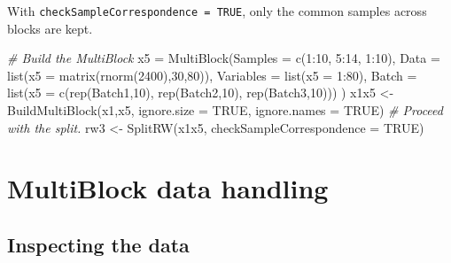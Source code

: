 \documentclass[
]{book}
\newenvironment{Shaded}{\begin{snugshade}}{\end{snugshade}}
\newcommand{\AttributeTok}[1]{\textcolor[rgb]{0.77,0.63,0.00}{#1}}
\newcommand{\CommentTok}[1]{\textcolor[rgb]{0.56,0.35,0.01}{\textit{#1}}}
\newcommand{\ConstantTok}[1]{\textcolor[rgb]{0.00,0.00,0.00}{#1}}
\newcommand{\DecValTok}[1]{\textcolor[rgb]{0.00,0.00,0.81}{#1}}
\newcommand{\FunctionTok}[1]{\textcolor[rgb]{0.00,0.00,0.00}{#1}}
\newcommand{\NormalTok}[1]{#1}
\newcommand{\OtherTok}[1]{\textcolor[rgb]{0.56,0.35,0.01}{#1}}
\newcommand{\SpecialCharTok}[1]{\textcolor[rgb]{0.00,0.00,0.00}{#1}}
\newcommand{\StringTok}[1]{\textcolor[rgb]{0.31,0.60,0.02}{#1}}
\begin{document}
With \texttt{checkSampleCorrespondence\ =\ TRUE}, only the common samples across blocks
are kept.

\begin{Shaded}
\begin{Highlighting}[]
\CommentTok{\# Build the MultiBlock}
\NormalTok{x5 }\OtherTok{=} \FunctionTok{MultiBlock}\NormalTok{(}\AttributeTok{Samples =} \FunctionTok{c}\NormalTok{(}\DecValTok{1}\SpecialCharTok{:}\DecValTok{10}\NormalTok{, }\DecValTok{5}\SpecialCharTok{:}\DecValTok{14}\NormalTok{, }\DecValTok{1}\SpecialCharTok{:}\DecValTok{10}\NormalTok{),}
                \AttributeTok{Data =} \FunctionTok{list}\NormalTok{(}\AttributeTok{x5 =} \FunctionTok{matrix}\NormalTok{(}\FunctionTok{rnorm}\NormalTok{(}\DecValTok{2400}\NormalTok{),}\DecValTok{30}\NormalTok{,}\DecValTok{80}\NormalTok{)),}
                \AttributeTok{Variables =} \FunctionTok{list}\NormalTok{(}\AttributeTok{x5 =} \DecValTok{1}\SpecialCharTok{:}\DecValTok{80}\NormalTok{),}
                \AttributeTok{Batch =} \FunctionTok{list}\NormalTok{(}\AttributeTok{x5 =} \FunctionTok{c}\NormalTok{(}\FunctionTok{rep}\NormalTok{(}\StringTok{\textquotesingle{}Batch1\textquotesingle{}}\NormalTok{,}\DecValTok{10}\NormalTok{),}
                                    \FunctionTok{rep}\NormalTok{(}\StringTok{\textquotesingle{}Batch2\textquotesingle{}}\NormalTok{,}\DecValTok{10}\NormalTok{),}
                                    \FunctionTok{rep}\NormalTok{(}\StringTok{\textquotesingle{}Batch3\textquotesingle{}}\NormalTok{,}\DecValTok{10}\NormalTok{)))}
\NormalTok{)}
\NormalTok{x1x5 }\OtherTok{\textless{}{-}} \FunctionTok{BuildMultiBlock}\NormalTok{(x1,x5, }\AttributeTok{ignore.size =} \ConstantTok{TRUE}\NormalTok{, }\AttributeTok{ignore.names =} \ConstantTok{TRUE}\NormalTok{)}
\CommentTok{\# Proceed with the split.}
\NormalTok{rw3 }\OtherTok{\textless{}{-}} \FunctionTok{SplitRW}\NormalTok{(x1x5, }\AttributeTok{checkSampleCorrespondence =} \ConstantTok{TRUE}\NormalTok{)}
\end{Highlighting}
\end{Shaded}

\hypertarget{handling}{%
\chapter{MultiBlock data handling}\label{handling}}

\hypertarget{inspecting-the-data}{%
\section{Inspecting the data}\label{inspecting-the-data}}
\end{document}
